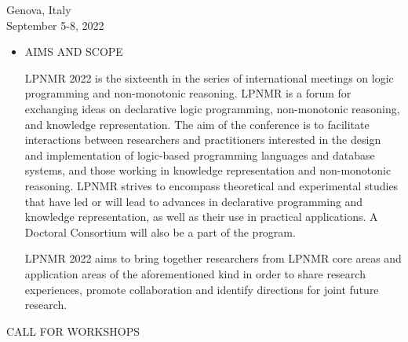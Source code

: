 \documentclass[prodmode,acmtecs]{acmsmall} %
\begin{document}
  Genova, Italy\\ 
  September 5-8, 2022\\ 
\begin{itemize}\item  AIMS AND SCOPE 
 
  LPNMR 2022 is the sixteenth in the series of international meetings on logic programming and non-monotonic reasoning. LPNMR is a forum for exchanging ideas on declarative logic programming, non-monotonic reasoning, and knowledge representation. The aim of the conference is to facilitate interactions between researchers and practitioners interested in the design and implementation of logic-based programming languages and database systems, and those working in knowledge representation and non-monotonic reasoning. LPNMR strives to encompass theoretical and experimental studies that have led or will lead to advances in declarative programming and knowledge representation, as well as their use in practical applications. A Doctoral Consortium will also be a part of the program. 
 
  LPNMR 2022 aims to bring together researchers from LPNMR core areas and application areas of the aforementioned kind in order to share research experiences, promote collaboration and identify directions for joint future research.  
 
\end{itemize}CALL FOR WORKSHOPS 
\end{document}
